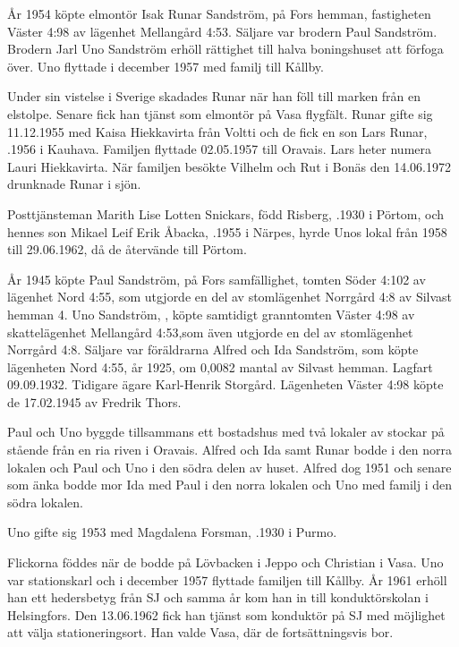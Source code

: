 År 1954 köpte elmontör Isak Runar Sandström,  på Fors hemman, fastigheten Väster 4:98 av lägenhet Mellangård 4:53. Säljare var brodern Paul Sandström. Brodern Jarl Uno Sandström erhöll rättighet till halva boningshuset att förfoga över. Uno flyttade i december 1957 med familj till Kållby.

Under sin vistelse i Sverige skadades Runar när han föll till marken från en elstolpe. Senare fick han tjänst som elmontör på Vasa flygfält. Runar gifte sig 11.12.1955 med Kaisa Hiekkavirta från Voltti och de fick en son Lars Runar, .1956 i Kauhava. Familjen flyttade 02.05.1957 till Oravais. Lars heter numera Lauri Hiekkavirta. När familjen besökte Vilhelm och Rut i Bonäs den 14.06.1972 drunknade Runar i sjön.

Posttjänsteman Marith Lise Lotten Snickars, född Risberg, .1930 i Pörtom, och hennes son Mikael Leif Erik Åbacka, .1955 i Närpes, hyrde Unos lokal från 1958 till 29.06.1962, då de återvände till Pörtom.


År 1945 köpte Paul Sandström,  på Fors samfällighet, tomten Söder 4:102 av lägenhet Nord 4:55, som utgjorde en del av stomlägenhet Norrgård 4:8 av Silvast hemman 4. Uno Sandström, , köpte samtidigt granntomten Väster 4:98 av skattelägenhet Mellangård 4:53,som även utgjorde en del av stomlägenhet Norrgård 4:8.  Säljare var föräldrarna Alfred och Ida Sandström, som köpte lägenheten Nord 4:55, år 1925, om 0,0082 mantal av Silvast hemman. Lagfart 09.09.1932. Tidigare ägare Karl-Henrik Storgård. Lägenheten Väster 4:98 köpte de 17.02.1945 av Fredrik Thors.

Paul och Uno byggde tillsammans ett bostadshus med två lokaler av stockar på stående från en ria riven i Oravais. Alfred och Ida samt Runar bodde i den norra lokalen och Paul och Uno i den södra delen av huset. Alfred dog 1951 och senare som änka bodde mor Ida med Paul i den norra lokalen och Uno med familj i den södra lokalen.

Uno gifte sig 1953 med Magdalena Forsman, .1930  i Purmo.
\begin{jhchildren}
  \item {}
  \item {}
  \item {}
\end{jhchildren}
Flickorna föddes när de bodde på Lövbacken i Jeppo och Christian i Vasa. Uno var stationskarl och i december 1957 flyttade familjen till Kållby. År 1961 erhöll han ett hedersbetyg från SJ och samma år kom han in till konduktörskolan i Helsingfors. Den 13.06.1962 fick han tjänst som konduktör på SJ med möjlighet att välja stationeringsort. Han valde Vasa, där de fortsättningsvis bor.



